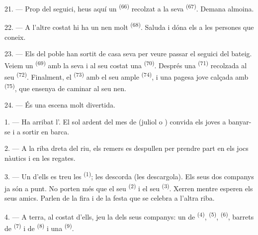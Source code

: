 \VUsaut{4.6mm}
\VUsaut{3.4mm}

21. --- Prop del seguici, heus aquí un  \textsuperscript{(66)}
recolzat a la seva  \textsuperscript{(67)}. Demana almoina.

22. --- A l'altre costat hi ha un nen molt 
\textsuperscript{(68)}. Saluda i dóna els  a les persones que
coneix.

23. --- Els del poble han sortit de casa seva per veure passar el seguici del
bateig. Veiem un  \textsuperscript{(69)} amb la seva  i al seu costat una  \textsuperscript{(70)}. Després una
 \textsuperscript{(71)} recolzada al seu 
\textsuperscript{(72)}. Finalment, el  \textsuperscript{(73)} amb
el seu ample  \textsuperscript{(74)}, i una pagesa jove
calçada amb  \textsuperscript{(75)}, que ensenya de caminar al seu
nen.

24. --- És una escena molt divertida.
\VUsaut{4.0mm}

\VUsaut{3.0mm}

\VUsaut{2.4mm}

\VUsaut{3.0mm}

1. --- Ha arribat l'. El sol ardent del mes de 
(juliol o ) convida els joves a banyar-se i a sortir en barca.

2. --- A la riba dreta del riu, els remers es despullen per prendre part en els
jocs nàutics i en les regates.

3. --- Un d'ells es treu les  \textsuperscript{(1)}; les descorda
(les descargola). Els seus dos companys ja són a punt. No porten més que el seu
 \textsuperscript{(2)} i el seu 
\textsuperscript{(3)}. Xerren mentre esperen els seus amics. Parlen de la fira i
de la festa que se celebra a l'altra riba.

4. --- A terra, al costat d'ells, jeu la  dels seus companys: un
 de  \textsuperscript{(4)}, 
\textsuperscript{(5)},  \textsuperscript{(6)}, barrets de
 \textsuperscript{(7)} i de  \textsuperscript{(8)} i
una  \textsuperscript{(9)}.


